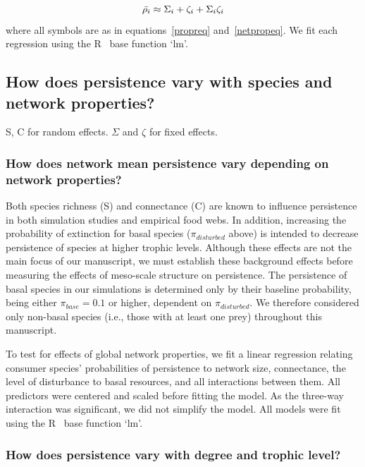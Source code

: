 \documentclass[12pt]{article}
\begin{document}
\begin{spacing}{2.0}
        \begin{equation}
            \Bar{\rho_{i}} \approx \Sigma_{i} + \zeta_{i} + \Sigma_{i}\zeta_{i}
        \end{equation}
        where all symbols are as in equations~\ref{propreq} and~\ref{netpropeq}.
        We fit each regression using the R~\citep{R} base function `lm'.
            

    \subsection{How does persistence vary with species and network properties?}

        S, C for random effects. $\Sigma$ and $\zeta$ for fixed effects.

        \subsubsection{How does network mean persistence vary depending on network properties?}
    
            Both species richness (S) and connectance (C) are known to influence persistence in both simulation studies and empirical food webs.
            In addition, increasing the probability of extinction for basal species ($\pi_{disturbed}$ above) is intended to decrease persistence of species at higher trophic levels.
            Although these effects are not the main focus of our manuscript, we must establish these background effects before measuring the effects of meso-scale structure on persistence.
            The persistence of basal species in our simulations is determined only by their baseline probability, being either $\pi_{base} = 0.1$ or higher, dependent on $\pi_{disturbed}$.
            We therefore considered only non-basal species (i.e., those with at least one prey) throughout this manuscript.

            To test for effects of global network properties, we fit a linear regression relating consumer species' probabilities of persistence to network size, connectance, the level of disturbance to basal resources, and all interactions between them. 
            All predictors were centered and scaled before fitting the model. 
            As the three-way interaction was significant, we did not simplify the model.
            All models were fit using the R~\citep{R} base function `lm'.

                  
        \subsubsection{How does persistence vary with degree and trophic level?}
    

\end{spacing}
\end{document}
